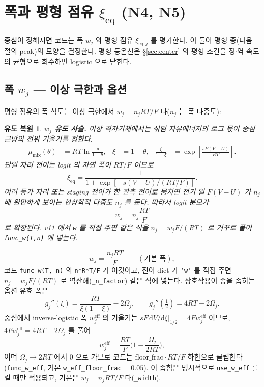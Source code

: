 \documentclass[11pt,a4paper]{article}
\newtheorem*{derivebox}{유도 복원}
\newcommand{\dd}{\mathrm{d}}
\newcommand{\eff}{\mathrm{eff}}
\newcommand{\eq}{\mathrm{eq}}
\newcommand{\code}[1]{\texttt{#1}}
\begin{document}
\section{폭과 평형 점유 $\xi_\eq$ (N4, N5)}\label{sec:width}
중심이 정해지면 코드는 폭 $w_j$ 와 평형 점유 $\xi_{\eq,j}$ 를 평가한다. 이 둘이 평형 종(다음 절의 peak)의 모양을
결정한다. 평형 등온선은 \S\ref{sec:center} 의 평형 조건을 정$\cdot$역 속도의 균형으로 회수하면 logistic 으로 닫힌다.

\subsection{폭 $w_j$ — 이상 극한과 옵션}
평형 점유의 폭 척도는 이상 극한에서 $w_j=n_jRT/F$ 다($n_j$ 는 폭 다중도):

\begin{derivebox}
\textbf{$w_j$ 유도 사슬.} 이상 격자기체에서는 섞임 자유에너지의 로그 몫이 중심 근방의 전위 기울기를 정한다.
\begin{align*}
\mu_{\mathrm{mix}}(\theta)&=RT\ln\frac{\theta}{1-\theta},
& \xi&=1-\theta,
& \frac{\xi}{1-\xi}&=\exp\!\left[\frac{sF(V-U)}{RT}\right].
\end{align*}
단일 자리 전이는 logit 의 자연 폭이 $RT/F$ 이므로
\begin{equation*}
\xi_{\eq}=\frac{1}{1+\exp[-s(V-U)/(RT/F)]}.
\end{equation*}
여러 등가 자리 또는 staging 전이가 한 관측 전이로 뭉치면 전기 일 $F(V-U)$ 가 $n_j$ 배 완만하게 보이는 현상학적 다중도 $n_j$ 를 둔다. 따라서 logit 분모가
\begin{equation*}
w_j=n_j\frac{RT}{F}
\end{equation*}
로 확장된다. v11 에서 \code{w} 를 직접 주면 같은 식을 $n_j=w_jF/(RT)$ 로 거꾸로 풀어 \code{func\_w(T,n)} 에 넣는다.
\end{derivebox}

\begin{equation}
w_j=\frac{n_jRT}{F}\qquad(\text{기본 폭}),
\label{eq:wbase}
\end{equation}
코드 \code{func\_w(T, n)} 의 \code{n*R*T/F}
가 이것이고, 전이 dict 가 \code{'w'} 를 직접 주면 $n_j=w_jF/(RT)$ 로 역산해(\code{\_n\_factor}) 같은 식에 넣는다.
상호작용이 종을 좁히는 옵션 유효 폭은
\begin{equation*}
g_j''(\xi)=\frac{RT}{\xi(1-\xi)}-2\Omega_j,\qquad
g_j''\!\left(\tfrac12\right)=4RT-2\Omega_j.
\end{equation*}
중심에서 inverse-logistic 폭 $w_j^\eff$ 의 기울기는 $sF\,\dd V/\dd\xi|_{1/2}=4F w_j^\eff$ 이므로,
$4F w_j^\eff=4RT-2\Omega_j$ 를 풀어
\begin{equation}
w_j^\eff=\frac{RT}{F}\Big(1-\frac{\Omega_j}{2RT}\Big),
\label{eq:weff}
\end{equation}
이며 $\Omega_j\to2RT$ 에서 $0$ 으로 가므로 코드는 $\mathrm{floor\_frac}\cdot RT/F$ 하한으로 클립한다(\code{func\_w\_eff},
기본 \code{w\_eff\_floor\_frac}$=0.05$). 이 좁힘은 명시적으로 \code{use\_w\_eff} 를 켤 때만 적용되고, 기본은
$w_j=n_jRT/F$ 다(\code{\_width}).
\end{document}
